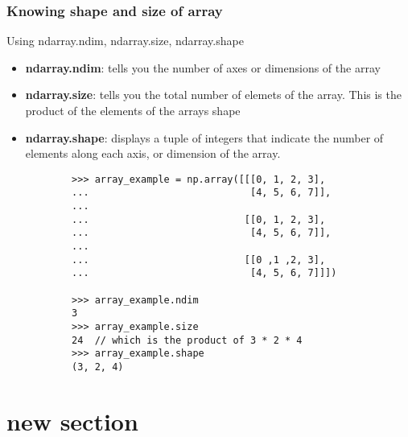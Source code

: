 \documentclass[12pt, a4paper]{article}
\begin{document}
\subsubsection{Knowing shape and size of array}
Using ndarray.ndim, ndarray.size, ndarray.shape

\begin{itemize}
    \item \textbf{ndarray.ndim}: tells you the number of axes or dimensions of the array
    \item \textbf{ndarray.size}: tells you the total number of elemets of the array. This is the product of the elements of the arrays shape
    \item \textbf{ndarray.shape}: displays a tuple of integers that indicate the number of elements along each axis, or dimension of the array.
    \begin{lstlisting}
        >>> array_example = np.array([[[0, 1, 2, 3],
        ...                            [4, 5, 6, 7]],
        ...
        ...                           [[0, 1, 2, 3],
        ...                            [4, 5, 6, 7]],
        ...
        ...                           [[0 ,1 ,2, 3],
        ...                            [4, 5, 6, 7]]])

        >>> array_example.ndim
        3
        >>> array_example.size
        24  // which is the product of 3 * 2 * 4
        >>> array_example.shape
        (3, 2, 4)

    \end{lstlisting}
\end{itemize}


\section{new section}
\end{document}

